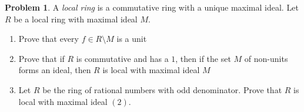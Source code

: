 \documentclass[letterpaper,11pt]{amsart}
\theoremstyle{plain}
\theoremstyle{definition}
\newtheorem{pr}{Problem}
\theoremstyle{remark}
\begin{document}
\begin{pr}
    A \emph{local ring} is a commutative ring with a unique maximal ideal.
    Let $R$ be a local ring with maximal ideal $M$.
    \begin{enumerate}
        \item Prove that every $f \in R \setminus M$ is a unit
        \item Prove that if $R$ is commutative and has a $1$, then if the set $M$ of non-units forms an ideal,
        then $R$ is local with maximal ideal $M$
        \item Let $R$ be the ring of rational numbers with odd denominator. Prove that $R$ is local with maximal ideal $(2)$.
    \end{enumerate}
\end{pr}
\end{document}
